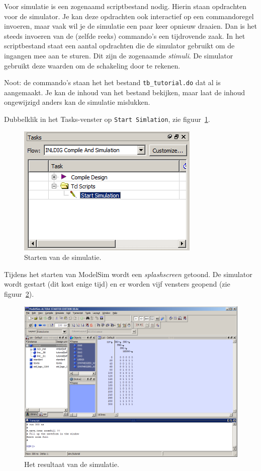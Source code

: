 \documentclass[a4paper,12pt,fleqn,twoside]{book}
\def\tutpicscale{0.455}
\newcommand{\naam}[1]{\texttt{#1}}
\begin{document}
Voor simulatie is een zogenaamd scriptbestand nodig. Hierin staan opdrachten
voor de simulator. Je kan deze opdrachten ook interactief op een commandoregel
invoeren, maar vaak wil je de simulatie een paar keer opnieuw draaien. Dan is
het steeds invoeren van de (zelfde reeks) commando's een tijdrovende zaak. 
In het scriptbestand staat een aantal opdrachten die de simulator gebruikt om
de ingangen mee aan te sturen. Dit zijn de zogenaamde \textsl{stimuli}. De
simulator gebruikt deze waarden om de schakeling door te rekenen. 
 
Noot: de commando's staan het het bestand \naam{tb\_tutorial.do} dat al is
aangemaakt. Je kan de inhoud van het bestand bekijken, maar laat de inhoud
ongewijzigd anders kan de simulatie mislukken. 
 
Dubbelklik in het Tasks-venster op \naam{Start Simlation}, zie
figuur~\ref{fig:043startsimulation}.

\begin{figure}[H]
\centering
\includegraphics[scale=\tutpicscale]{043startsimulation}
\caption{Starten van de simulatie.}
\label{fig:043startsimulation}
\end{figure}

Tijdens het starten van ModelSim wordt een \textsl{splashscreen} getoond.
De simulator wordt gestart (dit kost enige tijd) en er worden vijf vensters
geopend (zie figuur~\ref{fig:044modelsimstarted}). 

\begin{figure}[H]
\centering
\includegraphics[scale=\tutpicscale]{044modelsimstarted}
\caption{Het resultaat van de simulatie.}
\label{fig:044modelsimstarted}
\end{figure}
\end{document}
